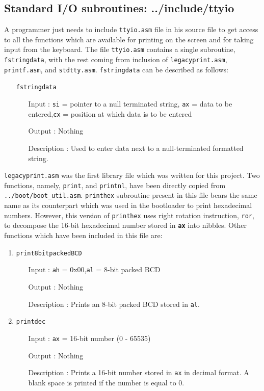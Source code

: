 \subsection{Standard I/O subroutines: ../include/ttyio}
A programmer just needs to include \texttt{ttyio.asm} file in his source file to get access to all the functions which are available for printing on the screen and for taking input from the keyboard. The file \texttt{ttyio.asm} contains a single subroutine, \texttt{fstringdata}, with the rest coming from inclusion of \texttt{legacyprint.asm}, \texttt{printf.asm}, and \texttt{stdtty.asm}. \texttt{fstringdata} can be described as follows:
\begin{enumerate}
  \item[]\texttt{fstringdata}
\begin{enumerate}[align=parleft, labelsep=2cm, leftmargin=1.5in]
  		  \item[Input]: \texttt{si} = pointer to a null terminated string, \newline\texttt{ax} = data to be entered,\newline\texttt{cx} = position at which data is to be entered
  		  \item[Output]: Nothing 
  		  \item[Description]: Used to enter data next to a null-terminated formatted string.
  		\end{enumerate}
\end{enumerate}
\texttt{legacyprint.asm} was the first library file which was written for this project. Two functions, namely, \verb|print|, and \texttt{printnl}, have been directly copied from \texttt{../boot/boot\_util.asm}. \texttt{printhex} subroutine present in this file bears the same name as its counterpart which was used in the bootloader to print hexadecimal numbers. However, this version of \texttt{printhex} uses right rotation instruction, \verb|ror|, to decompose the 16-bit hexadecimal number stored in \textbf{\texttt{ax}} into nibbles. Other functions which have been included in this file are: 
\begin{enumerate}
  \item \texttt{print8bitpackedBCD}
  		\begin{enumerate}[align=parleft, labelsep=2cm, leftmargin=1.06in]
  		  \item[Input]: \texttt{ah} = 0x00,\newline\texttt{al} = 8-bit packed BCD
  		  \item[Output]: Nothing
  		  \item[Description]: Prints an 8-bit packed BCD stored in \texttt{al}.
  		\end{enumerate}
  \item \texttt{printdec}
  		\begin{enumerate}[align=parleft, labelsep=2cm, leftmargin=1.06in]
  		  \item[Input]: \texttt{ax} = 16-bit number (0 - 65535)
  		  \item[Output]: Nothing
  		  \item[Description]: Prints a 16-bit number stored in \texttt{ax} in decimal format. A blank space is printed if the number is equal to 0.
  		\end{enumerate}
\end{enumerate}
